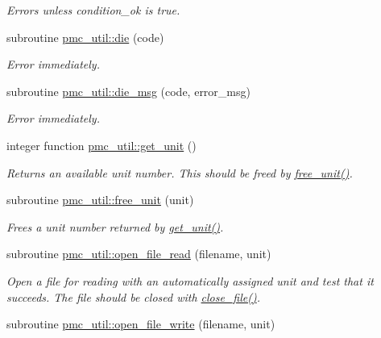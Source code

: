 \begin{DoxyCompactItemize}
\begin{DoxyCompactList}\small\item\em Errors unless condition\+\_\+ok is true. \end{DoxyCompactList}\item 
subroutine \mbox{\hyperlink{namespacepmc__util_ae2f8c4238f51e70e793d1572c823fef6}{pmc\+\_\+util\+::die}} (code)
\begin{DoxyCompactList}\small\item\em Error immediately. \end{DoxyCompactList}\item 
subroutine \mbox{\hyperlink{namespacepmc__util_aa6e9ef9e9da5f7b7f100405b86c74316}{pmc\+\_\+util\+::die\+\_\+msg}} (code, error\+\_\+msg)
\begin{DoxyCompactList}\small\item\em Error immediately. \end{DoxyCompactList}\item 
integer function \mbox{\hyperlink{namespacepmc__util_a76442600ebd1117db2a8db91d73f7737}{pmc\+\_\+util\+::get\+\_\+unit}} ()
\begin{DoxyCompactList}\small\item\em Returns an available unit number. This should be freed by \mbox{\hyperlink{namespacepmc__util_a74557f04ac600442864bec92848b4550}{free\+\_\+unit()}}. \end{DoxyCompactList}\item 
subroutine \mbox{\hyperlink{namespacepmc__util_a74557f04ac600442864bec92848b4550}{pmc\+\_\+util\+::free\+\_\+unit}} (unit)
\begin{DoxyCompactList}\small\item\em Frees a unit number returned by \mbox{\hyperlink{namespacepmc__util_a76442600ebd1117db2a8db91d73f7737}{get\+\_\+unit()}}. \end{DoxyCompactList}\item 
subroutine \mbox{\hyperlink{namespacepmc__util_aee3183d5ad7cf9bf38f966a4aecee252}{pmc\+\_\+util\+::open\+\_\+file\+\_\+read}} (filename, unit)
\begin{DoxyCompactList}\small\item\em Open a file for reading with an automatically assigned unit and test that it succeeds. The file should be closed with \mbox{\hyperlink{namespacepmc__util_ac91736b4f44a1623208ebe7f161e84ad}{close\+\_\+file()}}. \end{DoxyCompactList}\item 
subroutine \mbox{\hyperlink{namespacepmc__util_ab49e2a7d4958cc13e35bb5982d378da5}{pmc\+\_\+util\+::open\+\_\+file\+\_\+write}} (filename, unit)

\end{DoxyCompactItemize}
